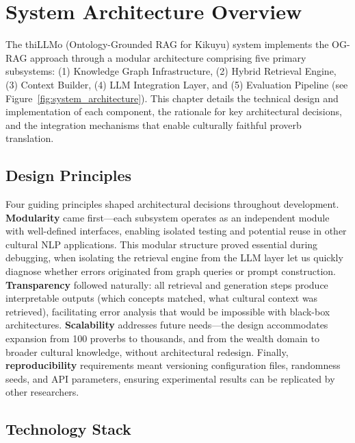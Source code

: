 \label{chap:design}

\section{System Architecture Overview}
\label{sec:system_architecture}

The thiLLMo (Ontology-Grounded RAG for Kikuyu) system implements the OG-RAG approach through a modular architecture comprising five primary subsystems: (1) Knowledge Graph Infrastructure, (2) Hybrid Retrieval Engine, (3) Context Builder, (4) LLM Integration Layer, and (5) Evaluation Pipeline (see Figure~\ref{fig:system_architecture}). This chapter details the technical design and implementation of each component, the rationale for key architectural decisions, and the integration mechanisms that enable culturally faithful proverb translation.

\subsection{Design Principles}
\label{subsec:design_principles}

Four guiding principles shaped architectural decisions throughout development. \textbf{Modularity} came first—each subsystem operates as an independent module with well-defined interfaces, enabling isolated testing and potential reuse in other cultural NLP applications. This modular structure proved essential during debugging, when isolating the retrieval engine from the LLM layer let us quickly diagnose whether errors originated from graph queries or prompt construction. \textbf{Transparency} followed naturally: all retrieval and generation steps produce interpretable outputs (which concepts matched, what cultural context was retrieved), facilitating error analysis that would be impossible with black-box architectures. \textbf{Scalability} addresses future needs—the design accommodates expansion from 100 proverbs to thousands, and from the wealth domain to broader cultural knowledge, without architectural redesign. Finally, \textbf{reproducibility} requirements meant versioning configuration files, randomness seeds, and API parameters, ensuring experimental results can be replicated by other researchers.

\subsection{Technology Stack}
\label{subsec:tech_stack}

